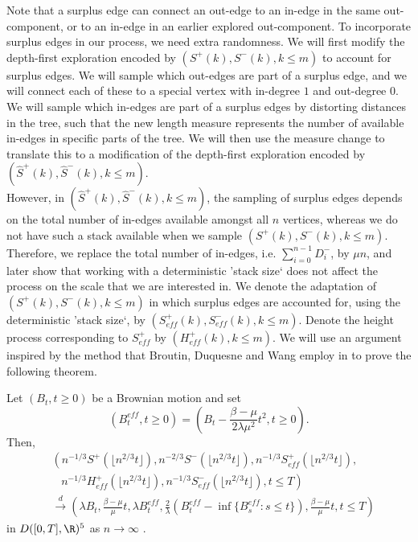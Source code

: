 Note that a surplus edge can connect an out-edge to an in-edge in the same out-component, or to an in-edge in an earlier explored out-component. To incorporate surplus edges in our process, we need extra randomness. We will first modify the depth-first exploration encoded by $(S^+(k),S^-(k), k\leq m)$ to account for surplus edges. We will sample which out-edges are part of a surplus edge, and we will connect each of these to a special vertex with in-degree $1$ and out-degree $0$. We will sample which in-edges are part of a surplus edges by distorting distances in the tree, such that the new length measure represents the number of available in-edges in specific parts of the tree. We will then use the measure change to translate this to a modification of the depth-first exploration encoded by $(\hat{S}^+(k),\hat{S}^-(k), k\leq m)$. \\
However, in $(\hat{S}^+(k),\hat{S}^-(k), k\leq m)$, the sampling of surplus edges depends on the total number of in-edges available amongst all $n$ vertices, whereas we do not have such a stack available when we sample $(S^+(k),S^-(k), k\leq m)$. Therefore, we replace the total number of in-edges, i.e. $\sum_{i=0}^{n-1} D^-_i$, by $\mu n$, and later show that working with a deterministic 'stack size` does not affect the process on the scale that we are interested in. We denote the adaptation of $(S^+(k),S^-(k), k\leq m)$ in which surplus edges are accounted for, using the deterministic 'stack size`, by $(S^+_{eff}(k),S^-_{eff}(k), k\leq m)$. Denote the height process corresponding to $S^+_{eff}$ by $(H^+_{eff}(k), k\leq m)$. We will use an argument inspired by the method that Broutin, Duquesne and Wang employ in \cite{Broutin2020} to prove the following theorem. 
\begin{theorem}\label{thm.convergenceSeff}
Let $(B_t,t\geq 0)$ be a Brownian motion and set $$(B^{eff}_t,t\geq 0)=\left(B_t-\frac{\beta - \mu}{2\lambda \mu^2}t^2,t\geq 0\right).$$ Then,
\begin{align*}
    &\left(n^{-1/3}S^+\left(\lfloor n^{2/3}t\rfloor\right),n^{-2/3}S^-\left(\lfloor n^{2/3}t\rfloor\right), n^{-1/3}S^+_{eff}\left(\lfloor n^{2/3}t\rfloor\right),\right.\\
    &\;\;\;\left.n^{-1/3}H^+_{eff}\left(\lfloor n^{2/3}t\rfloor\right), n^{-1/3}S^-_{eff}\left(\lfloor n^{2/3}t\rfloor\right), t\leq T\right)\\
    &\overset{d}{\to}\left(\lambda B_t, \frac{\beta-\mu}{\mu} t, \lambda B^{eff}_t,  \frac{2}{\lambda} \left(B^{eff}_{t}-\inf\{B^{eff}_{s}:s\leq t\}\right), \frac{\beta-\mu}{\mu} t, t\leq T\right)
\end{align*}
in $D([0,T],\R)^5$ as $n\to \infty$ . 
\end{theorem}

